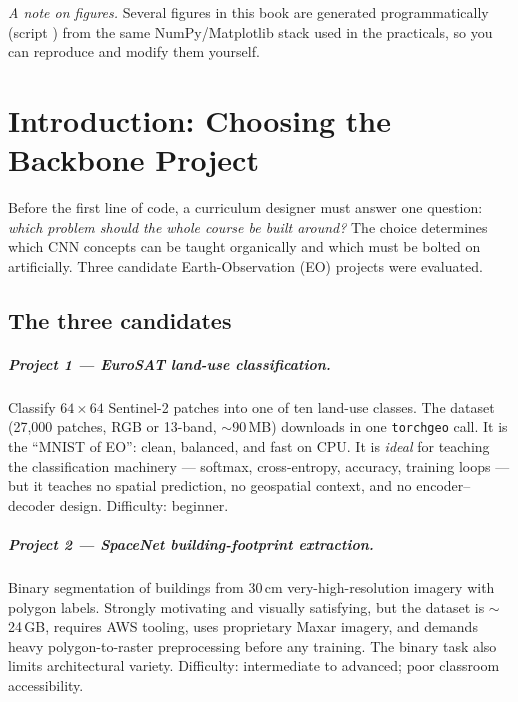 \documentclass[11pt,openany]{book}
\newcommand{\nbpath}[1]{\texttt{\seqsplit{#1}}}
\theoremstyle{definition}
\begin{document}
\vspace{1em}
\noindent\emph{A note on figures.} Several figures in this book are generated
programmatically (script \nbpath{docs/textbook/make\_figures.py}) from the same
NumPy/Matplotlib stack used in the practicals, so you can reproduce and modify
them yourself.

\chapter*{Introduction: Choosing the Backbone Project}

Before the first line of code, a curriculum designer must answer one question:
\emph{which problem should the whole course be built around?} The choice
determines which CNN concepts can be taught organically and which must be
bolted on artificially. Three candidate Earth-Observation (EO) projects were
evaluated.

\section*{The three candidates}

\paragraph{Project 1 --- EuroSAT land-use classification.}
Classify $64\times64$ Sentinel-2 patches into one of ten land-use classes.
The dataset (27{,}000 patches, RGB or 13-band, $\sim$90\,MB) downloads in one
\texttt{torchgeo} call. It is the ``MNIST of EO'': clean, balanced, and fast
on CPU. It is \emph{ideal} for teaching the classification machinery ---
softmax, cross-entropy, accuracy, training loops --- but it teaches no spatial
prediction, no geospatial context, and no encoder--decoder design. Difficulty:
beginner.

\paragraph{Project 2 --- SpaceNet building-footprint extraction.}
Binary segmentation of buildings from 30\,cm very-high-resolution imagery with
polygon labels. Strongly motivating and visually satisfying, but the dataset is
$\sim$24\,GB, requires AWS tooling, uses proprietary Maxar imagery, and demands
heavy polygon-to-raster preprocessing before any training. The binary task also
limits architectural variety. Difficulty: intermediate to advanced; poor
classroom accessibility.
\end{document}
